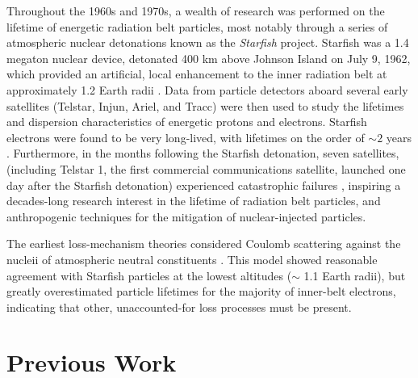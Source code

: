 Throughout the 1960s and 1970s, a wealth of research was performed on the lifetime of energetic radiation belt particles, most notably through a series of atmospheric nuclear detonations known as the \emph{Starfish} project\footnotemark. Starfish was a 1.4 megaton nuclear device, detonated 400 km above Johnson Island on July 9, 1962, which provided an artificial, local enhancement to the inner radiation belt at approximately 1.2 Earth radii \citep{Hess1963}. Data from particle detectors aboard several early satellites (Telstar, Injun, Ariel, and Tracc) were then used to study the lifetimes and dispersion characteristics of energetic protons and electrons. Starfish electrons were found to be very long-lived, with lifetimes on the order of $\sim 2$ years \citep{Beall1967}. Furthermore, in the months following the Starfish detonation, seven satellites, (including Telstar 1, the first commercial communications satellite, launched one day after the Starfish detonation) experienced catastrophic failures \citep{Wenaas1978, Barth2003, Conrad2010}, inspiring a decades-long research interest in the lifetime of radiation belt particles, and anthropogenic techniques for the mitigation of nuclear-injected particles.

The earliest loss-mechanism theories considered Coulomb scattering against the nucleii of atmospheric neutral constituents \citep{Walt1964}. This model showed reasonable agreement with Starfish particles at the lowest altitudes ($\sim$ 1.1 Earth radii), but greatly overestimated particle lifetimes for the majority of inner-belt electrons, indicating that other, unaccounted-for loss processes must be present. 


\section{Previous Work}

